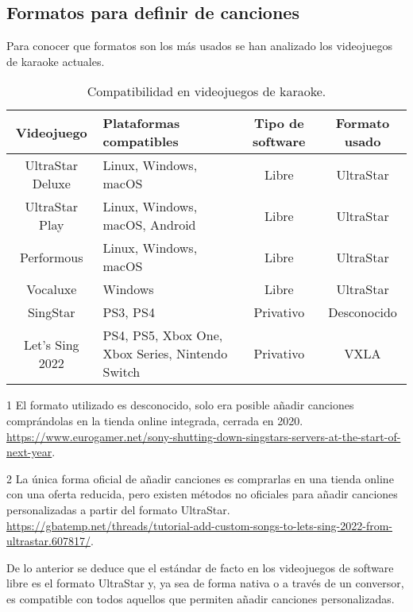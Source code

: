 \subsection{Formatos para definir de canciones}

Para conocer que formatos son los más usados se han analizado los videojuegos de karaoke actuales.

\begin{table}[h!]
	\begin{threeparttable}
		\caption{Compatibilidad en videojuegos de karaoke.}
		\begin{tabular}{ |c|>{\centering\arraybackslash}m{}|c|c|}
			\hline
			\textbf{Videojuego} & \textbf{Plataformas compatibles} & \textbf{Tipo de software} & \textbf{Formato usado} \\
			\hline
			UltraStar Deluxe & Linux, Windows, macOS & Libre & UltraStar \\
			UltraStar Play & Linux, Windows, macOS, Android & Libre & UltraStar \\
			Performous & Linux, Windows, macOS & Libre & UltraStar \\
			Vocaluxe & Windows & Libre & UltraStar \\
			SingStar & PS3, PS4 & Privativo & Desconocido\tnote{1} \\
			Let's Sing 2022 & PS4, PS5, Xbox One, Xbox Series, Nintendo Switch & Privativo & VXLA\tnote{2} \\
			\hline
		\end{tabular}
		\begin{tablenotes}
			\item [1] El formato utilizado es desconocido, solo era posible añadir canciones comprándolas en la tienda online integrada, cerrada en 2020. \url{https://www.eurogamer.net/sony-shutting-down-singstars-servers-at-the-start-of-next-year}.
			\item [2] La única forma oficial de añadir canciones es comprarlas en una tienda online con una oferta reducida, pero existen métodos no oficiales para añadir canciones personalizadas a partir del formato UltraStar.  \url{https://gbatemp.net/threads/tutorial-add-custom-songs-to-lets-sing-2022-from-ultrastar.607817/}.
		\end{tablenotes}
	\end{threeparttable}
\end{table}

De lo anterior se deduce que el estándar de facto en los videojuegos de software libre es el formato UltraStar y, ya sea de forma nativa o a través de un conversor, es compatible con todos aquellos que permiten añadir canciones personalizadas.



